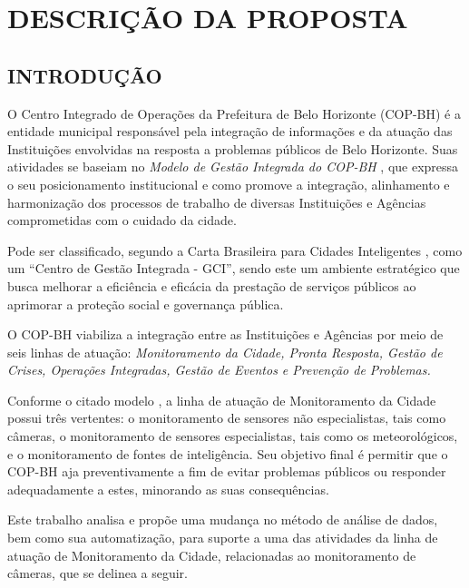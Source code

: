 
\chapter{DESCRIÇÃO DA PROPOSTA}
\label{chap:descricao}

\section{INTRODUÇÃO}
\label{sec:introducao}
O Centro Integrado de Operações da Prefeitura de Belo Horizonte (COP-BH) é a entidade municipal responsável pela integração de informações e da atuação das Instituições envolvidas na resposta a problemas públicos de Belo Horizonte. Suas atividades se baseiam no \textit{Modelo de Gestão Integrada do COP-BH} \cite{ModeloGestaoCOP}, que expressa o seu posicionamento institucional e como promove a integração, alinhamento e harmonização dos processos de trabalho de diversas Instituições e Agências comprometidas com o cuidado da cidade.

Pode ser classificado, segundo a Carta Brasileira para Cidades Inteligentes \cite{CartaCidades}, como um ``Centro de Gestão Integrada - GCI'', sendo este um ambiente estratégico que busca melhorar a eficiência e eficácia da prestação de serviços públicos ao aprimorar a proteção social e governança pública.

O COP-BH viabiliza a integração entre as Instituições e Agências por meio de seis linhas de atuação: \textit{Monitoramento da Cidade, Pronta Resposta, Gestão de Crises, Operações Integradas, Gestão de Eventos e Prevenção de Problemas.}

Conforme o citado modelo \cite{ModeloGestaoCOP}, a linha de atuação de Monitoramento da Cidade possui três vertentes: o monitoramento de sensores não especialistas, tais como câmeras, o monitoramento de sensores especialistas, tais como os meteorológicos, e o monitoramento de fontes de inteligência. Seu objetivo final é permitir que o COP-BH aja preventivamente a fim de evitar problemas públicos ou responder adequadamente a estes, minorando as suas consequências.

Este trabalho analisa e propõe uma mudança no método de análise de dados, bem como sua automatização, para suporte a uma das atividades da linha de atuação de Monitoramento da Cidade, relacionadas ao monitoramento de câmeras, que se delinea a seguir.

